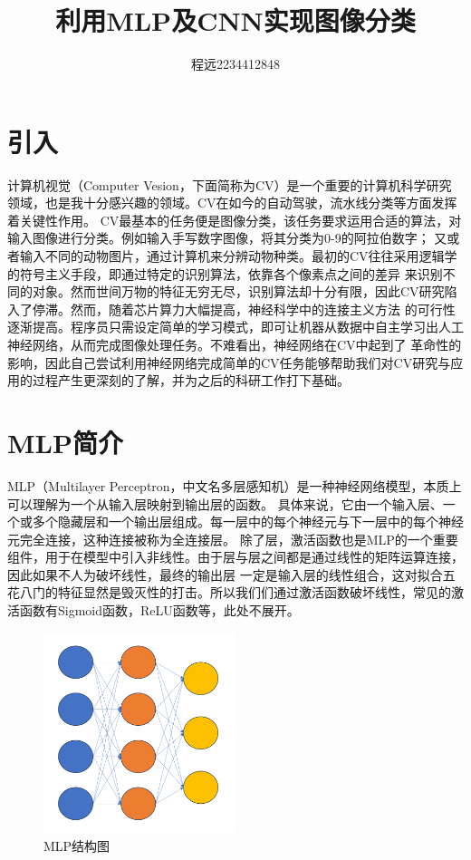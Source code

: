 \documentclass[UTF8]{ctexart}
\begin{document}
\title{\vspace{0cm}利用MLP及CNN实现图像分类}
\author{程远2234412848}
\date{}
\maketitle
\tableofcontents
\newpage
\section{引入}
计算机视觉（Computer Vesion，下面简称为CV）是一个重要的计算机科学研究领域，也是我十分感兴趣的领域。CV在如今的自动驾驶，流水线分类等方面发挥着关键性作用。
CV最基本的任务便是图像分类，该任务要求运用合适的算法，对输入图像进行分类。例如输入手写数字图像，将其分类为0-9的阿拉伯数字；
又或者输入不同的动物图片，通过计算机来分辨动物种类。最初的CV往往采用逻辑学的符号主义手段，即通过特定的识别算法，依靠各个像素点之间的差异
来识别不同的对象。然而世间万物的特征无穷无尽，识别算法却十分有限，因此CV研究陷入了停滞。然而，随着芯片算力大幅提高，神经科学中的连接主义方法
的可行性逐渐提高。程序员只需设定简单的学习模式，即可让机器从数据中自主学习出人工神经网络，从而完成图像处理任务。不难看出，神经网络在CV中起到了
革命性的影响，因此自己尝试利用神经网络完成简单的CV任务能够帮助我们对CV研究与应用的过程产生更深刻的了解，并为之后的科研工作打下基础。
\section{MLP简介}
MLP（Multilayer Perceptron，中文名多层感知机）是一种神经网络模型，本质上可以理解为一个从输入层映射到输出层的函数。
具体来说，它由一个输入层、一个或多个隐藏层和一个输出层组成。每一层中的每个神经元与下一层中的每个神经元完全连接，这种连接被称为全连接层。
除了层，激活函数也是MLP的一个重要组件，用于在模型中引入非线性。由于层与层之间都是通过线性的矩阵运算连接，因此如果不人为破坏线性，最终的输出层
一定是输入层的线性组合，这对拟合五花八门的特征显然是毁灭性的打击。所以我们们通过激活函数破坏线性，常见的激活函数有Sigmoid函数，ReLU函数等，此处不展开。

\begin{figure}[h]
    \centering
    \includegraphics[width=0.5\textwidth]{MLP.png}
    \caption*{MLP结构图}
\end{figure}
\end{document}
